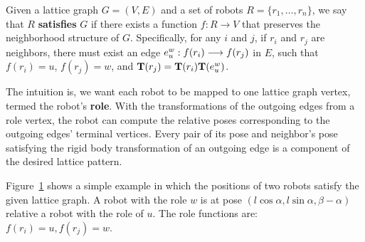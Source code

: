 \begin{defn}
\label{def:satisfy}
  Given a lattice graph $G=(V, E)$ and a set of robots
    $R = \{ r_1, \ldots, r_n \}$,
  we say that $R$ \textbf{satisfies} $G$ if there exists a function
    $f: R \rightarrow V$
  that preserves the neighborhood structure of $G$.
  Specifically, for any $i$ and $j$, if $r_i$ and $r_j$ are neighbors, 
  there must exist an edge
  $e_u^w: {f(r_i)}\overset{}{\longrightarrow}{f(r_j)}$ in $E$, such that 
      $f(r_i) = u$,
      $f(r_j) = w$, and $\mathbf{T}(r_j) = \mathbf{T}(r_i) \mathbf{T}(e_{u}^w)$.
\end{defn}

The intuition is, we want each robot to be mapped to one lattice graph vertex, termed the robot's \textbf{role}.
%
With the transformations of the outgoing edges from a role vertex, 
the robot can compute the relative poses corresponding to the outgoing edges' terminal vertices.
%
Every pair of its pose and neighbor's pose satisfying the rigid body transformation of an outgoing edge is a component of the desired lattice pattern.

Figure~\ref{fig:edgetrans} shows a simple example in which the positions of two
robots satisfy the given lattice graph. 
%
A robot with the role $w$ is
at pose $(l\cos{\alpha}, l\sin{\alpha}, \beta-\alpha)$ relative a robot with the role of
$u$. 
The role functions are: $f(r_i) = u, f(r_j) = w$.

\begin{figure}
  \centering
  
  \label{fig:edgetrans}
\end{figure}

